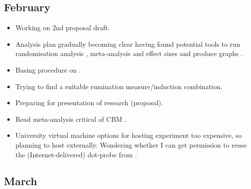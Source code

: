 \documentclass[british]{article}
\begin{document}
\subsection{February}

\begin{itemize}
  \item Working on 2nd proposal draft.
  \item Analysis plan gradually becoming clear having found potential
  tools to run randomisation analysis
    \parencite{bulte_r_2008}, meta-analysis and effect sizes
    \parencite{bulte_singlecase_2013} and produce graphs
    \parencite{bulte_when_2012}.

  \item Basing procedure on \textcite{macleod_cognitive_2012}.
  \item Trying to find a suitable rumination measure/induction combination.
  \item Preparing for presentation of research (proposal).
  \item Read meta-analysis critical of CBM \parencite{cristea_efficacy_2015}.
  \item University virtual machine options for hosting experiment too expensive,
    so planning to host externally. Wondering whether I can get permission to
    reuse the (Internet-delivered) dot-probe from \textcite{see_reduction_2009}.
\end{itemize}

\subsection{March}
\end{document}
